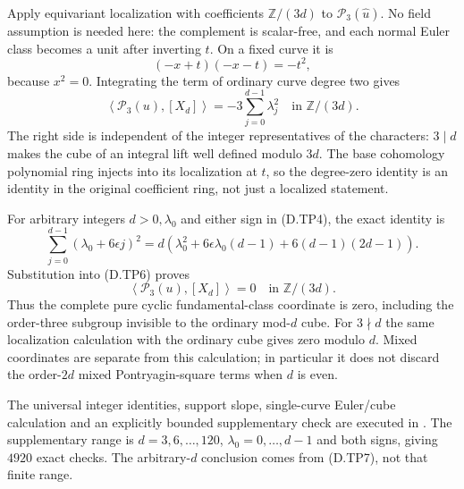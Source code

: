 Apply equivariant localization with coefficients
$\mathbb Z/(3d)$ to $\mathcal P_3(\widehat u)$.
No field assumption is needed here: the complement
is scalar-free, and each normal Euler class becomes
a unit after inverting $t$. On a fixed curve it is
\[
                    (-x+t)(-x-t)=-t^2,
\]
because $x^2=0$. Integrating the term of ordinary
curve degree two gives
\[
 \left\langle\mathcal P_3(u),[X_d]\right\rangle
                      =-3\sum_{j=0}^{d-1}\lambda_j^2
                                  \quad\text{in }\mathbb Z/(3d).
                                                               \tag{D.TP6}
\]
The right side is independent of the integer
representatives of the characters: $3\mid d$ makes
the cube of an integral lift well defined modulo
$3d$. The base cohomology polynomial ring injects
into its localization at $t$, so the degree-zero
identity is an identity in the original coefficient
ring, not just a localized statement.

For arbitrary integers $d>0,\lambda_0$ and either
sign in (D.TP4), the exact identity is
\[
 \sum_{j=0}^{d-1}(\lambda_0+6\epsilon j)^2
   =d\left(\lambda_0^2+6\epsilon\lambda_0(d-1)
                         +6(d-1)(2d-1)\right).              \tag{D.TP7}
\]
Substitution into (D.TP6) proves
\[
                 \left\langle\mathcal P_3(u),[X_d]\right\rangle=0
                                  \quad\text{in }\mathbb Z/(3d).
                                                               \tag{D.TP8}
\]
Thus the complete pure cyclic fundamental-class coordinate
is zero, including the order-three subgroup invisible to
the ordinary mod-$d$ cube. For $3\nmid d$ the same
localization calculation with the ordinary cube gives
zero modulo $d$. Mixed coordinates are separate from
this calculation; in particular it does not discard
the order-$2d$ mixed Pontryagin-square terms when $d$
is even.

The universal integer identities, support slope,
single-curve Euler/cube calculation and an explicitly
bounded supplementary check are executed in
.
The supplementary range is $d=3,6,\ldots,120$,
$\lambda_0=0,\ldots,d-1$ and both signs, giving
$4920$ exact checks. The arbitrary-$d$ conclusion
comes from (D.TP7), not that finite range.
